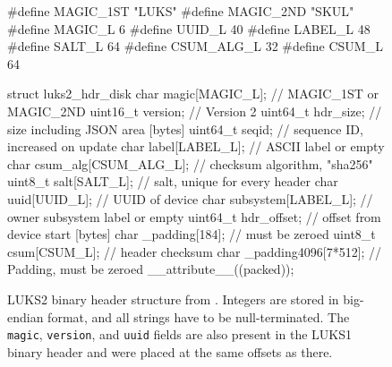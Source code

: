 \begin{figure}[htb!]
	\begin{ccode}
#define MAGIC_1ST "LUKS\xba\xbe"
#define MAGIC_2ND "SKUL\xba\xbe"
#define MAGIC_L     6
#define UUID_L     40
#define LABEL_L    48
#define SALT_L     64
#define CSUM_ALG_L 32
#define CSUM_L     64

struct luks2_hdr_disk {
    char     magic[MAGIC_L];       // MAGIC_1ST or MAGIC_2ND
    uint16_t version;              // Version 2
    uint64_t hdr_size;             // size including JSON area [bytes]
    uint64_t seqid;                // sequence ID, increased on update
    char     label[LABEL_L];       // ASCII label or empty
    char     csum_alg[CSUM_ALG_L]; // checksum algorithm, "sha256"
    uint8_t  salt[SALT_L];         // salt, unique for every header
    char     uuid[UUID_L];         // UUID of device
    char     subsystem[LABEL_L];   // owner subsystem label or empty
    uint64_t hdr_offset;           // offset from device start [bytes]
    char    _padding[184];         // must be zeroed
    uint8_t  csum[CSUM_L];         // header checksum
    char    _padding4096[7*512];   // Padding, must be zeroed
} __attribute__((packed));
	\end{ccode}
	\caption[
		LUKS2 binary header structure
	]{
		LUKS2 binary header structure from \cite{Broz2018}. Integers are stored in big-endian format, and all strings have to be null-terminated. The \texttt{magic}, \texttt{version}, and \texttt{uuid} fields are also present in the LUKS1 binary header and were placed at the same offsets as there.
	}
	\label{fig:background.luks2.binhdrstructure}
\end{figure}

